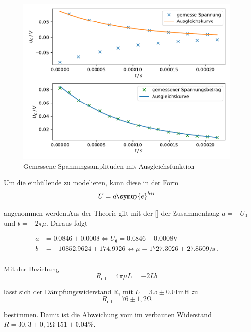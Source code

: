 \newpage
\begin{figure}
    \centering
    \label{fig:1}
    \includegraphics{Daten/a.pdf}
    \caption{Gemessene Spannungsamplituden mit Ausgleichsfunktion}
\end{figure}

Um die einhüllende zu modelieren, kann diese in der Form
\begin{equation}
    U = a \symup{e}^{b*t}
\end{equation}

\noindent
angenommen werden.Aus der Theorie gilt mit der \autoref{} der Zusammenhang $a = \pm U_0$ und $b = -2 \pi \mu$. Daraus folgt %


\begin{align*}
    a &= 0.0846 \pm 0.0008 \Leftrightarrow U_0 = 0.0846 \pm 0.0008 \si{\volt} \\
    b &= -10852.9624 \pm 174.9926 \Leftrightarrow \mu = 1727.3026 \pm 27.8509 \si{\per\second} \, .\\
\end{align*}

\noindent
Mit der Beziehung 
\begin{equation}
    R_\text{eff} = 4\pi\mu L = -2 L b
\end{equation}

\noindent
lässt sich der Dämpfungswiderstand R, mit $L = 3.5 \pm 0.01 \si{\milli\henry}$ zu
\begin{equation*}
    R_\text{eff} = 76 \pm 1,2 \si{\ohm}
\end{equation*}

\noindent
bestimmen. Damit ist die Abweichung vom im verbauten Widerstand $R = 30,3 \pm 0,1 \si{\ohm}$ $151 \pm 0.04 \si{\percent}$.

